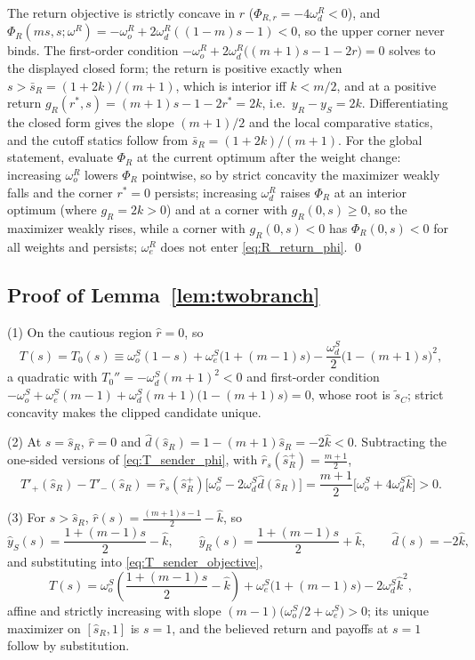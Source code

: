 \documentclass[11pt]{article}
\theoremstyle{plain}
\theoremstyle{remark}
\begin{document}
The return objective is strictly concave in $r$ ($\Phi_{R,r}=-4\omega_d^R<0$), and $\Phi_R(ms,s;\omega^R)=-\omega_o^R+2\omega_d^R((1-m)s-1)<0$, so the upper corner never binds.  The first-order condition $-\omega_o^R+2\omega_d^R\big((m+1)s-1-2r\big)=0$ solves to the displayed closed form; the return is positive exactly when $s>\bar s_R=(1+2k)/(m+1)$, which is interior iff $k<m/2$, and at a positive return $g_R(r^\ast,s)=(m+1)s-1-2r^\ast=2k$, i.e.\ $y_R-y_S=2k$.  Differentiating the closed form gives the slope $(m+1)/2$ and the local comparative statics, and the cutoff statics follow from $\bar s_R=(1+2k)/(m+1)$.  For the global statement, evaluate $\Phi_R$ at the current optimum after the weight change: increasing $\omega_o^R$ lowers $\Phi_R$ pointwise, so by strict concavity the maximizer weakly falls and the corner $r^\ast=0$ persists; increasing $\omega_d^R$ raises $\Phi_R$ at an interior optimum (where $g_R=2k>0$) and at a corner with $g_R(0,s)\ge0$, so the maximizer weakly rises, while a corner with $g_R(0,s)<0$ has $\Phi_R(0,s)<0$ for all weights and persists; $\omega_e^R$ does not enter \eqref{eq:R_return_phi}.
\qed

\subsection*{Proof of Lemma~\ref{lem:twobranch}}

(1) On the cautious region $\hat r=0$, so
\[
        T(s)=T_0(s)\equiv\omega_o^S(1-s)+\omega_e^S\big(1+(m-1)s\big)-\frac{\omega_d^S}{2}\big(1-(m+1)s\big)^2,
\]
a quadratic with $T_0''=-\omega_d^S(m+1)^2<0$ and first-order condition $-\omega_o^S+\omega_e^S(m-1)+\omega_d^S(m+1)\big(1-(m+1)s\big)=0$, whose root is $\tilde s_C$; strict concavity makes the clipped candidate unique.

(2) At $s=\hat s_R$, $\hat r=0$ and $\hat d(\hat s_R)=1-(m+1)\hat s_R=-2\hat k<0$.  Subtracting the one-sided versions of \eqref{eq:T_sender_phi}, with $\hat r_s(\hat s_R^+)=\tfrac{m+1}2$,
\[
        T'_+(\hat s_R)-T'_-(\hat s_R)
        =
        \hat r_s(\hat s_R^+)\big[\omega_o^S-2\omega_d^S\hat d(\hat s_R)\big]
        =
        \frac{m+1}2\big[\omega_o^S+4\omega_d^S\hat k\big]>0.
\]

(3) For $s>\hat s_R$, $\hat r(s)=\frac{(m+1)s-1}{2}-\hat k$, so
\[
        \hat y_S(s)=\frac{1+(m-1)s}{2}-\hat k,
        \qquad
        \hat y_R(s)=\frac{1+(m-1)s}{2}+\hat k,
        \qquad
        \hat d(s)=-2\hat k,
\]
and substituting into \eqref{eq:T_sender_objective},
\[
        T(s)
        =
        \omega_o^S\left(\frac{1+(m-1)s}{2}-\hat k\right)
        +\omega_e^S\big(1+(m-1)s\big)
        -2\omega_d^S\hat k^2,
\]
affine and strictly increasing with slope $(m-1)\big(\omega_o^S/2+\omega_e^S\big)>0$; its unique maximizer on $[\hat s_R,1]$ is $s=1$, and the believed return and payoffs at $s=1$ follow by substitution.
\end{document}
